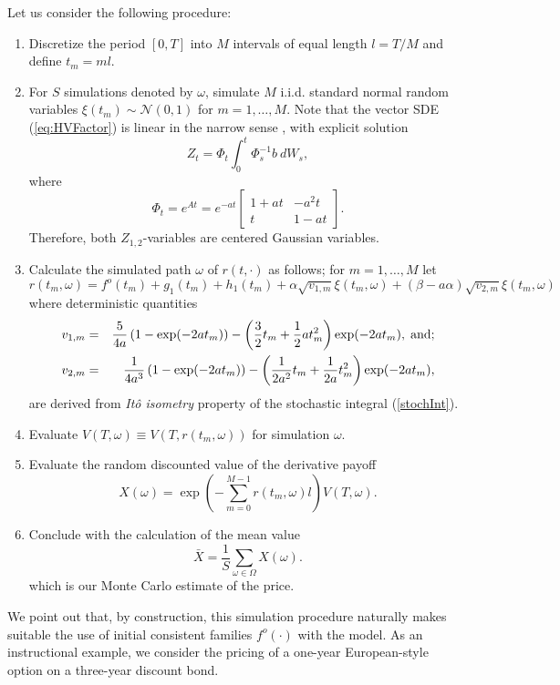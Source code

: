 Let us consider the following procedure:
\begin{enumerate}
\item Discretize the period $[0,T]$ into $M$ intervals of equal length
  $l = T/M$ and define $t_m = m l$.
\item For $S$ simulations denoted by $\omega$, simulate $M$
  i.i.d. standard normal random variables $\xi (t_m) \sim
  \mathcal{N}(0,1)$ for $m=1, \dots, M$. Note that the vector SDE
  (\ref{eq:HVFactor}) is linear in the narrow sense \cite{KP:1999},
  with explicit solution
\begin{equation}
\label{stochInt}
Z_t=\Phi_t\int^t_0 \Phi^{-1}_sb\:dW_s,
\end{equation}
where 
$$
\Phi_t=e^{A t}=e^{-a t}\left[\begin{array}{rr}
1+a t & -a^2 t \\
t & 1-a t
\end{array}\right].
$$
 Therefore, both $Z_{1,2}$-variables are centered Gaussian variables.
\item Calculate the simulated path $\omega$ of $r(t,\cdot)$ as
  follows; for $m=1, \dots, M$ let
\begin{equation}
\label{SRevolution}
r(t_m, \omega) = f^o(t_m)+ g_1(t_m) + h_1(t_m)+\alpha  \sqrt{v_{1,m}}
\xi (t_m, \omega) + \left( \beta -a \alpha \right)  \sqrt{v_{2,m}}
\xi (t_m, \omega)  
\end{equation}
where deterministic quantities
\begin{eqnarray}
\nonumber
v_{1,m} &= & \frac{5}{4a} \left( 1-\exp(-2at_m) \right)-\left( \frac{3}{2}t_m
+\frac{1}{2} at_m^2 \right) \exp(-2at_m),\; {\rm and;}\\
\nonumber
v_{2,m} & = & \frac{1}{4 a^3} \left(1-\exp(-2at_m) \right)- \left( \frac{1}{2a^2} t_m+
  \frac{1}{2 a} t_m^2 \right) \exp(-2at_m),
\end{eqnarray}
are derived from {\sl It\^o isometry} property of the stochastic
integral (\ref{stochInt}).
\item Evaluate $V(T,\omega) \equiv V(T, r(t_m, \omega))$ for
  simulation $\omega$. 
\item Evaluate the random discounted value of the derivative payoff
\begin{equation}
\label{randomvar}
X(\omega) = \exp \left( -\sum_{m=0}^{M-1} r(t_m, \omega) l \right)
V(T, \omega).
\end{equation}
\item Conclude with the calculation of the mean value 
$$
\bar{X} = \frac{1}{S} \sum_{\omega \in \Omega} X(\omega).
$$
which is our Monte Carlo estimate of the price.
\end{enumerate}
We point out that, by construction, this simulation procedure
naturally makes suitable the use of initial consistent families
$f^o(\cdot)$ with the model. 
As an instructional example, we consider the pricing of a one-year
European-style option on a three-year discount bond.

